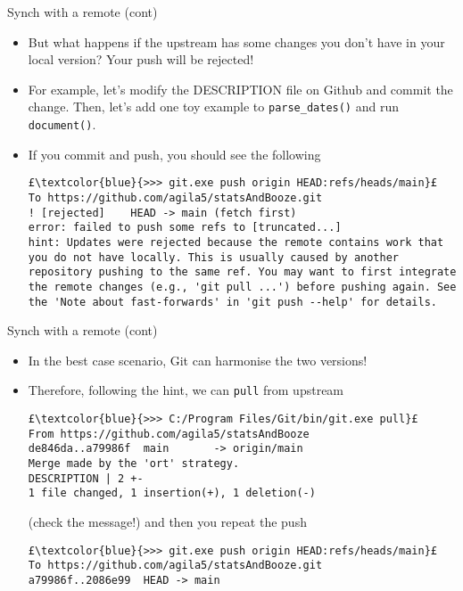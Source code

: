 \documentclass[
hyperref={bookmarks=false},
xcolor={dvipsnames,svgnames*,x11names*}, 
12pt
]{beamer}
\begin{document}
\begin{frame}[fragile]{Synch with a remote (cont)}
\vspace{-0.5cm}
\begin{itemize}
\itemsep 2ex
\item But what happens if the upstream has some changes you don't have in your local version? Your push will be rejected!  
\item For example, let's modify the DESCRIPTION file on Github and commit the change. Then, let's add one toy example to \texttt{parse\_dates()} and run \texttt{document()}. 
\item If you commit and push, you should see the following
\begin{lstlisting}
£\textcolor{blue}{>>> git.exe push origin HEAD:refs/heads/main}£
To https://github.com/agila5/statsAndBooze.git
! [rejected]    HEAD -> main (fetch first)
error: failed to push some refs to [truncated...]
hint: Updates were rejected because the remote contains work that you do not have locally. This is usually caused by another repository pushing to the same ref. You may want to first integrate the remote changes (e.g., 'git pull ...') before pushing again. See the 'Note about fast-forwards' in 'git push --help' for details.
\end{lstlisting}
\end{itemize}
\end{frame}

\begin{frame}[fragile]{Synch with a remote (cont)}
\vspace{-0.5cm}
\begin{itemize}
\itemsep 1ex
\item In the best case scenario, Git can harmonise the two versions! 
\item Therefore, following the hint, we can \texttt{pull} from upstream 
\begin{lstlisting}
£\textcolor{blue}{>>> C:/Program Files/Git/bin/git.exe pull}£
From https://github.com/agila5/statsAndBooze
de846da..a79986f  main       -> origin/main
Merge made by the 'ort' strategy.
DESCRIPTION | 2 +-
1 file changed, 1 insertion(+), 1 deletion(-)
\end{lstlisting}
(check the message!) and then you repeat the push 
\begin{lstlisting}
£\textcolor{blue}{>>> git.exe push origin HEAD:refs/heads/main}£
To https://github.com/agila5/statsAndBooze.git
a79986f..2086e99  HEAD -> main
\end{lstlisting}
\end{itemize}
\end{frame}
\end{document}

